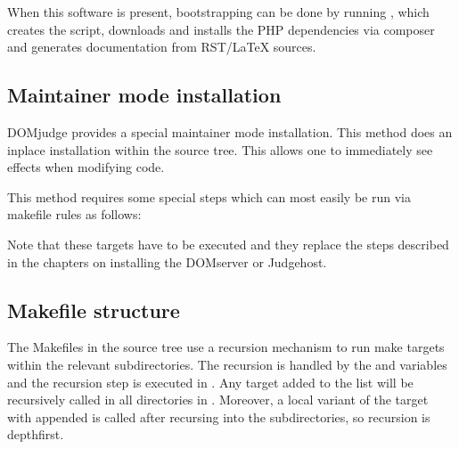 \documentclass[a4paper,10pt,english,openany]{sphinxmanual}
\begin{document}
\sphinxAtStartPar
When this software is present, bootstrapping can be done by running
, which creates the  script,
downloads and installs the PHP dependencies via composer and
generates documentation from RST/LaTeX sources.


\subsection{Maintainer mode installation}
\label{\detokenize{develop:maintainer-mode-installation}}
\sphinxAtStartPar
DOMjudge provides a special maintainer mode installation.
This method does an in\sphinxhyphen{}place installation within the source
tree. This allows one to immediately see effects when modifying
code.

\sphinxAtStartPar
This method requires some special steps which can most easily
be run via makefile rules as follows:

\begin{sphinxVerbatim}[commandchars=\\\{\}]
  \PYG{p}{[}   \PYG{p}{]}
 
\end{sphinxVerbatim}

\sphinxAtStartPar
Note that these targets have to be executed  and
they replace the steps described in the chapters on installing
the DOMserver or Judgehost.


\subsection{Makefile structure}
\label{\detokenize{develop:makefile-structure}}
\sphinxAtStartPar
The Makefiles in the source tree use a recursion mechanism to run make
targets within the relevant subdirectories. The recursion is handled
by the  and  variables and the
recursion step is executed in . Any target
added to the  list will be recursively called in
all directories in . Moreover, a local variant of the
target with  appended is called after recursing into the
subdirectories, so recursion is depth\sphinxhyphen{}first.
\end{document}
